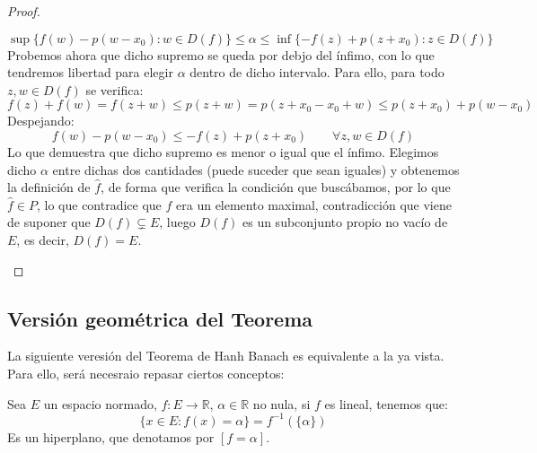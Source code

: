 \begin{teo}
\begin{proof}
\begin{itemize}
                \begin{equation*}
                    \sup\{f(w)-p(w-x_0) : w\in D(f)\} \leq \alpha \leq \inf\{-f(z)+p(z+x_0) : z\in D(f)\}
                \end{equation*}
                Probemos ahora que dicho supremo se queda por debjo del ínfimo, con lo que tendremos libertad para elegir $\alpha$ dentro de dicho intervalo. Para ello, para todo $z,w\in D(f)$ se verifica:
                \begin{equation*}
                    f(z) + f(w) = f(z+w) \leq p(z+w) = p(z+x_0-x_0+w) \leq p(z+x_0) + p(w-x_0)
                \end{equation*}
                Despejando:
                \begin{equation*}
                    f(w) - p(w-x_0) \leq -f(z) + p(z+x_0) \qquad \forall z,w\in D(f)
                \end{equation*}
                Lo que demuestra que dicho supremo es menor o igual que el ínfimo. Elegimos dicho $\alpha$ entre dichas dos cantidades (puede suceder que sean iguales) y obtenemos la definición de $\hat{f}$, de forma que verifica la condición que buscábamos, por lo que $\hat{f}\in P$, lo que contradice que $f$ era un elemento maximal, contradicción que viene de suponer que $D(f)\subsetneq E$, luego $D(f)$ es un subconjunto propio no vacío de $E$, es decir, $D(f) = E$.
        \end{itemize}
    \end{proof}
\end{teo}

\subsection{Versión geométrica del Teorema}
\noindent
La siguiente veresión del Teorema de Hanh Banach es equivalente a la ya vista. Para ello, será necesraio repasar ciertos conceptos:

\begin{observacion}
Sea $E$ un espacio normado, $f:E\to \mathbb{R}$, $\alpha\in \mathbb{R}$ no nula, si $f$ es lineal, tenemos que:
\begin{equation*}
    \{x\in E : f(x) = \alpha\} = f^{-1}(\{\alpha\})
\end{equation*}
Es un hiperplano, que denotamos por $[f=\alpha]$.
\end{observacion}

